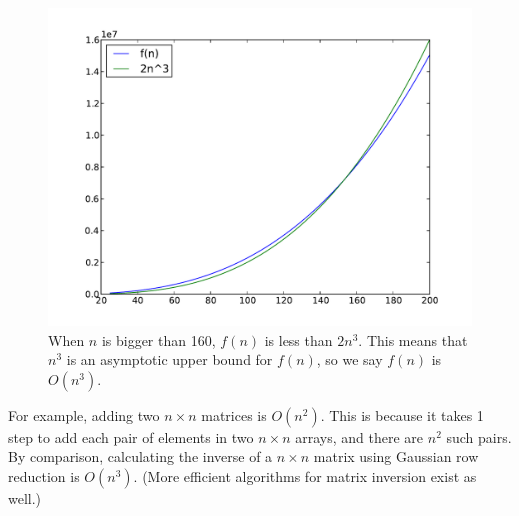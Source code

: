 \begin{figure}
\centering
\includegraphics[width=\textwidth]{asymp_upper_bound.pdf}
\caption{When $n$ is bigger than 160, $f(n)$ is less than $2n^3$. This means that $n^3$ is an asymptotic upper bound for $f(n)$, so we say $f(n)$ is $O(n^3)$.}
\label{fig:asymp_upper_bound}
\end{figure}

For example, adding two $n \times n$ matrices is $O(n^2)$. 
This is because it takes 1 step to add each pair of elements in two $n \times n$ arrays, and there are $n^2$ such pairs.
By comparison, calculating the inverse of a $n \times n$ matrix using Gaussian row reduction is $O(n^3)$. 
(More efficient algorithms for matrix inversion exist as well.)

